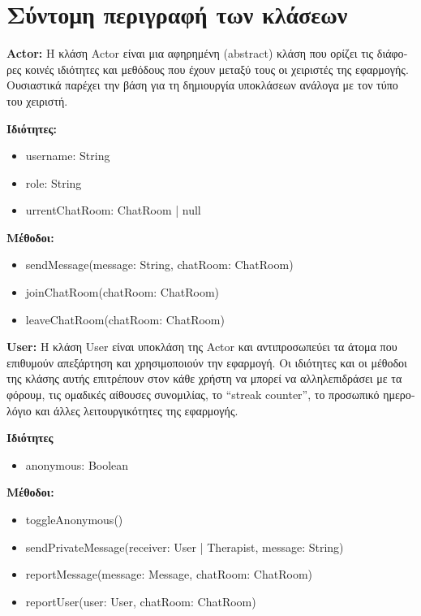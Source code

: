 \documentclass{article}
\begin{document}
\newpage
\section*{\textgreek{Σύντομη περιγραφή των κλάσεων}}
\textbf{Actor:} \textgreek{Η κλάση} Actor \textgreek{είναι μια αφηρημένη} (abstract) \textgreek{κλάση που ορίζει τις διάφορες κοινές ιδιότητες και μεθόδους που έχουν μεταξύ τους οι χειριστές της εφαρμογής. Ουσιαστικά παρέχει την βάση για τη δημιουργία υποκλάσεων ανάλογα με τον τύπο του χειριστή.}
\newline
\newline

\textbf{\textgreek{Ιδιότητες:}}
\begin{itemize}
    \item username: String
    \item role: String
    \item urrentChatRoom: ChatRoom | null
\end{itemize}
\textbf{\textgreek{Μέθοδοι:}}
\begin{itemize}
    \item sendMessage(message: String, chatRoom: ChatRoom)
    \item joinChatRoom(chatRoom: ChatRoom)
    \item leaveChatRoom(chatRoom: ChatRoom)
\end{itemize}

\textbf{User:} \textgreek{Η κλάση} User \textgreek{είναι υποκλάση της} Actor \textgreek{και αντιπροσωπεύει τα άτομα που επιθυμούν απεξάρτηση και χρησιμοποιούν την εφαρμογή. Οι ιδιότητες και οι μέθοδοι της κλάσης αυτής επιτρέπουν στον κάθε χρήστη να μπορεί να αλληλεπιδράσει με τα φόρουμ, τις ομαδικές αίθουσες συνομιλίας, το} “streak counter”, \textgreek{το προσωπικό ημερολόγιο και άλλες λειτουργικότητες της εφαρμογής.}
\newline
\newline

\textbf{\textgreek{Ιδιότητες}}
\begin{itemize}
    \item anonymous: Boolean
\end{itemize}
\textbf{\textgreek{Μέθοδοι:}}
\begin{itemize}
    \item toggleAnonymous()
    \item sendPrivateMessage(receiver: User | Therapist, message: String)
    \item reportMessage(message: Message, chatRoom: ChatRoom)
    \item reportUser(user: User, chatRoom: ChatRoom)
\end{itemize}
\end{document}
